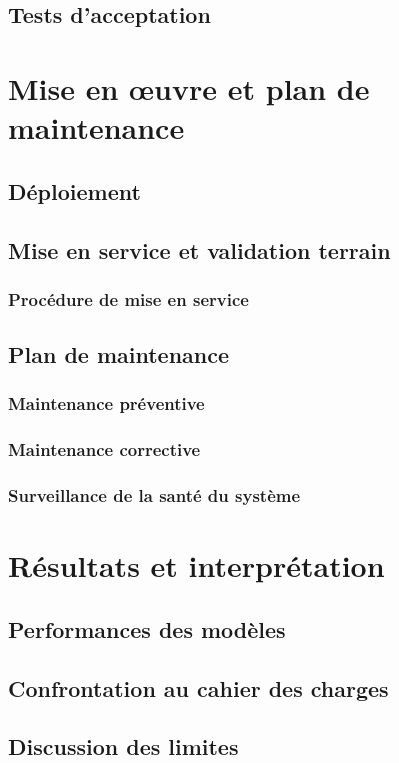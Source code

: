 \documentclass[12pt,a4paper]{report}
\begin{document}
\subsection{Tests d'acceptation}
\section{Mise en œuvre et plan de maintenance}
\subsection{Déploiement}
\subsection{Mise en service et validation terrain}
\subsubsection{Procédure de mise en service}
\subsection{Plan de maintenance}
\subsubsection{Maintenance préventive}
\subsubsection{Maintenance corrective}
\subsubsection{Surveillance de la santé du système}
\section{Résultats et interprétation}
\subsection{Performances des modèles}
\subsection{Confrontation au cahier des charges}
\subsection{Discussion des limites}
\end{document}
